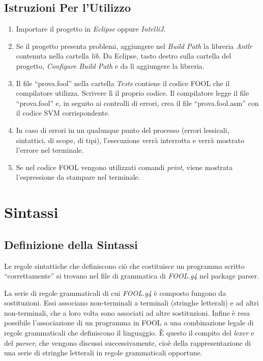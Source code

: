 \documentclass{scrreprt}
\begin{document}
\section{Istruzioni Per l'Utilizzo}
\begin{enumerate}
    \item Importare il progetto in \textit{Eclipse} oppure \textit{IntelliJ}.
    \item Se il progetto presenta problemi, aggiungere nel \textit{Build Path} la libreria \textit{Antlr} contenuta nella cartella \textit{lib}.
        Da Eclipse, tasto destro sulla cartella del progetto, \textit{Configure Build Path} e da lì aggiungere la libreria.
    \item Il file ``prova.fool'' nella cartella \textit{Tests} contiene il codice FOOL che il compilatore utilizza. Scrivere lì il proprio codice. 
        Il compilatore legge il file ``prova.fool'' e, in seguito ai controlli di errori, crea il file ``prova.fool.asm'' con il codice SVM corrispondente.
    \item In caso di errori in un qualunque punto del processo (errori lessicali, sintattici, di scope, di tipi), l'esecuzione verrà interrotta e verrà mostrato l'errore
        nel terminale.
    \item Se nel codice FOOL vengono utilizzati comandi \textit{print}, viene mostrata l'espressione da stampare nel terminale. 
\end{enumerate}

\chapter{Sintassi}

\section{Definizione della Sintassi}
Le regole sintattiche che definiscono ciò che costituisce un programma scritto ``correttamente'' si 
trovano nel file di grammatica di \textit{FOOL.g4} nel package parser.

La serie di regole grammaticali di cui \textit{FOOL.g4} è composto fungono da sostituzioni. Essi associano 
non-terminali a terminali (stringhe letterali) e ad altri non-terminali, che a loro volta sono associati 
ad altre sostituzioni. Infine è resa possibile l’associazione di un programma in FOOL a una combinazione legale
di regole grammaticali che definiscono il linguaggio. 
È questo il compito del \textit{lexer} e del \textit{parser}, che vengono discussi successivamente, cioè della 
rappresentazione di una serie di stringhe letterali in regole grammaticali opportune. 
\end{document}
